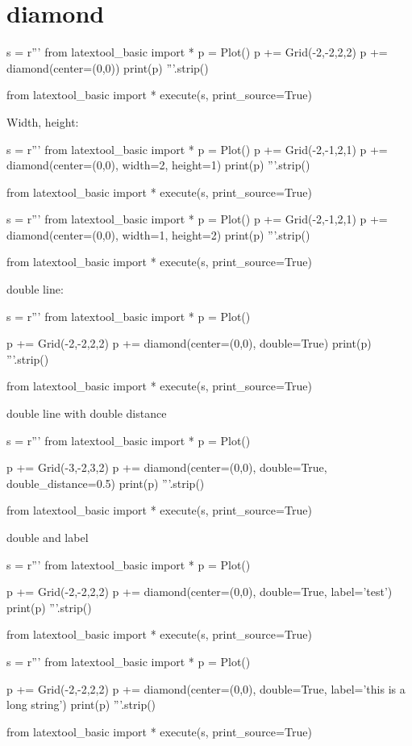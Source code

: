 \section{diamond}

\begin{python}
s = r'''
from latextool_basic import *
p = Plot()
p += Grid(-2,-2,2,2)
p += diamond(center=(0,0))
print(p)
'''.strip()

from latextool_basic import *
execute(s, print_source=True)
\end{python}


\newpage
Width, height:
\begin{python}
s = r'''
from latextool_basic import *
p = Plot()
p += Grid(-2,-1,2,1)
p += diamond(center=(0,0), width=2, height=1)
print(p)
'''.strip()

from latextool_basic import *
execute(s, print_source=True)
\end{python}

\begin{python}
s = r'''
from latextool_basic import *
p = Plot()
p += Grid(-2,-1,2,1)
p += diamond(center=(0,0), width=1, height=2)
print(p)
'''.strip()

from latextool_basic import *
execute(s, print_source=True)
\end{python}


\newpage
double line:
\begin{python}
s = r'''
from latextool_basic import *
p = Plot()

p += Grid(-2,-2,2,2)
p += diamond(center=(0,0), double=True)
print(p)
'''.strip()

from latextool_basic import *
execute(s, print_source=True)
\end{python}


double line with double distance
\begin{python}
s = r'''
from latextool_basic import *
p = Plot()

p += Grid(-3,-2,3,2)
p += diamond(center=(0,0), double=True, double_distance=0.5)
print(p)
'''.strip()

from latextool_basic import *
execute(s, print_source=True)
\end{python}


\newpage
double and label
\begin{python}
s = r'''
from latextool_basic import *
p = Plot()

p += Grid(-2,-2,2,2)
p += diamond(center=(0,0), double=True, label='test')
print(p)
'''.strip()

from latextool_basic import *
execute(s, print_source=True)
\end{python}

\begin{python}
s = r'''
from latextool_basic import *
p = Plot()

p += Grid(-2,-2,2,2)
p += diamond(center=(0,0), double=True, label='this is a long string')
print(p)
'''.strip()

from latextool_basic import *
execute(s, print_source=True)
\end{python}

